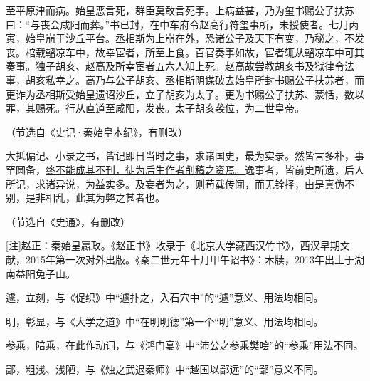\documentclass[11pt,a4paper]{ctexart}
\begin{document}
\begin{materialtext}
至平原津而病。始皇恶言死，群臣莫敢言死事。上病益甚，乃为玺书赐公子扶苏曰：“与丧会咸阳而葬。”书已封，在中车府令赵高行符玺事所，未授使者。七月丙寅，始皇崩于沙丘平台。丞相斯为上崩在外，恐诸公子及天下有变，乃秘之，不发丧。棺载轀凉车中，故幸宦者，所至上食。百官奏事如故，宦者辄从轀凉车中可其奏事。独子胡亥、赵高及所幸宦者五六人知上死。赵高故尝教胡亥书及狱律令法事，胡亥私幸之。高乃与公子胡亥、丞相斯阴谋破去始皇所封书赐公子扶苏者，而更诈为丞相斯受始皇遗诏沙丘，立子胡亥为太子。更为书赐公子扶苏、蒙恬，数以罪，其赐死。行从直道至咸阳，发丧。太子胡亥袭位，为二世皇帝。
\end{materialtext}
\begin{flushright}（节选自《史记·秦始皇本纪》，有删改）\end{flushright}

\begin{materialtext}
大抵偏记、小录之书，皆记即日当时之事，求诸国史，最为实录。然皆言多朴，事罕圆备，\uline{终不能成其不刊，徒为后生作者削稿之资焉。}逸事者，皆前史所遗，后人所记，求诸异说，为益实多。及妄者为之，则苟载传闻，而无铨择，由是真伪不别，是非相乱，此其为弊之甚者也。
\end{materialtext}
\begin{flushright}（节选自《史通》，有删改）\end{flushright}

[注]赵正：秦始皇嬴政。《赵正书》收录于《北京大学藏西汉竹书》，西汉早期文献，2015年第一次对外出版。《秦二世元年十月甲午诏书》：木牍，2013年出土于湖南益阳兔子山。



\begin{choices}
\item 遽，立刻，与《促织》中“遽扑之，入石穴中”的“遽”意义、用法均相同。
\item 明，彰显，与《大学之道》中“在明明德”第一个“明”意义、用法均相同。
\item 参乘，陪乘，在此作动词，与《鸿门宴》中“沛公之参乘樊哙”的“参乘”用法不同。
\item 鄙，粗浅、浅陋，与《烛之武退秦师》中“越国以鄙远”的“鄙”意义不同。
\end{choices}
\end{document}

